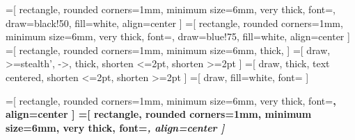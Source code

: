 =[
    rectangle,
    rounded corners=1mm,
    minimum size=6mm,
    very thick,
    font=\normalsize,
    draw=black!50,
    fill=white,
    align=center
]            
=[
    rectangle,
    rounded corners=1mm,
    minimum size=6mm,
    very thick,
    font=\normalsize,
    draw=blue!75,
    fill=white,
    align=center
]
=[
    rectangle,
    rounded corners=1mm,
    minimum size=6mm,
    thick,
]
=[
   draw,
   >=stealth',	%
   ->,
   thick,
   shorten <=2pt,
   shorten >=2pt
]
=[
    draw,
    thick,
    text centered,
    shorten <=2pt,
    shorten >=2pt
]
=[
    draw,
    fill=white,
    font=\tiny
]

=[
    rectangle,
    rounded corners=1mm,
    minimum size=6mm,
    very thick,
    font=\normalsize\bfseries,
    align=center
]      
=[
    rectangle,
    rounded corners=1mm,
    minimum size=6mm,
    very thick,
    font=\normalsize\itshape,
    align=center
]      